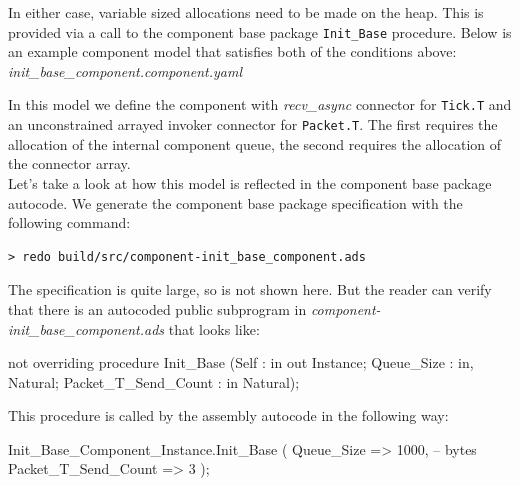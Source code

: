 In either case, variable sized allocations need to be made on the heap. This is provided via a call to the component base package \texttt{Init\_Base} procedure. Below is an example component model that satisfies both of the conditions above: \\

\textit{init\_base\_component.component.yaml}

In this model we define the component with \textit{recv\_async} connector for \texttt{Tick.T} and an unconstrained arrayed invoker connector for \texttt{Packet.T}. The first requires the allocation of the internal component queue, the second requires the allocation of the connector array. \\

Let's take a look at how this model is reflected in the component base package autocode. We generate the component base package specification with the following command:

\vspace{5mm} %
\begin{verbatim}
> redo build/src/component-init_base_component.ads
\end{verbatim}
\vspace{5mm} %

The specification is quite large, so is not shown here. But the reader can verify that there is an autocoded public subprogram in \textit{component-init\_base\_component.ads} that looks like:

\vspace{5mm} %
\begin{adacode}
  not overriding procedure Init_Base (Self : in out Instance; Queue_Size : in, Natural; Packet_T_Send_Count : in Natural);
\end{adacode}
\vspace{5mm} %

This procedure is called by the assembly autocode in the following way:

\vspace{5mm} %
\begin{adacode}
  Init_Base_Component_Instance.Init_Base (
    Queue_Size => 1000,         -- bytes
    Packet_T_Send_Count => 3 
  );
\end{adacode}
\vspace{5mm} %

